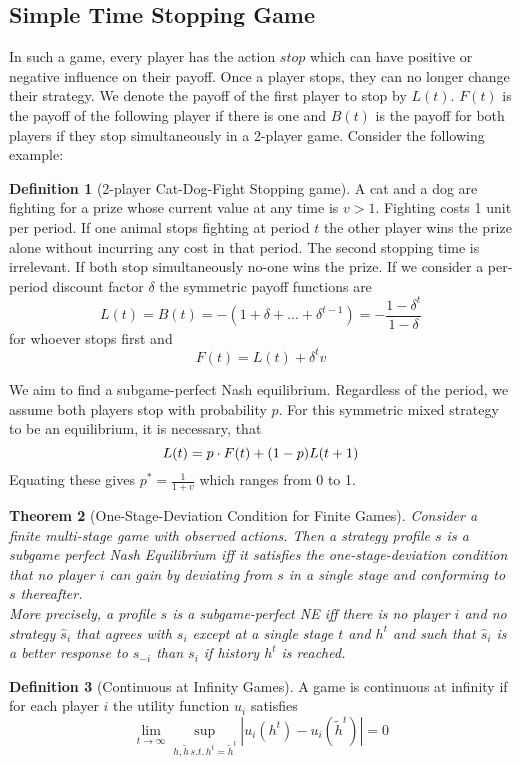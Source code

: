 \documentclass[a4paper, 12pt]{article}
\theoremstyle{plain}
\newtheorem{theorem}{Theorem}[subsection] %
\theoremstyle{definition}
\newtheorem{definition}[theorem]{Definition} %
\theoremstyle{lemma}
\theoremstyle{remark}
\theoremstyle{corollary}
\theoremstyle{example}
\begin{document}
	\subsection{Simple Time Stopping Game}
	In such a game, every player has the action $stop$ which can have positive or negative influence on their payoff. Once a player stops, they can no longer change their strategy. We denote the payoff of the first player to stop by $L(t)$. $F(t)$ is the payoff of the following player if there is one and $B(t)$ is the payoff for both players if they stop simultaneously in a 2-player game. Consider the following example:
	\begin{definition}[2-player Cat-Dog-Fight Stopping game]
		A cat and a dog are fighting for a prize whose current value at any time is $v>1$. Fighting costs 1 unit per period. If one animal stops fighting at period $t$ the other player wins the prize alone without incurring any cost in that period. The second stopping time is irrelevant. If both stop simultaneously no-one wins the prize. If we consider a per-period discount factor $\delta$ the symmetric payoff functions are \[L(t) = B(t) = -(1+\delta + ... + \delta^{t-1}) = -\frac{1-\delta^t}{1-\delta}\] for whoever stops first and \[F(t) = L(t)+\delta^tv\]
	\end{definition}
	We aim to find a subgame-perfect Nash equilibrium. Regardless of the period, we assume both players stop with probability $p$. For this symmetric mixed strategy to be an equilibrium, it is necessary, that \[L(t) = p\cdot F(t) + (1-p)L(t+1\\)\] Equating these gives $p^* = \frac{1}{1+v}$ which ranges from 0 to 1.
	\begin{theorem}[One-Stage-Deviation Condition for Finite Games]
		Consider a finite multi-stage game with observed actions. Then a strategy profile $s$ is a subgame perfect Nash Equilibrium iff it satisfies the one-stage-deviation condition that no player $i$ can gain by deviating from $s$ in a single stage and conforming to $s$ thereafter.\\
		More precisely, a profile $s$ is a subgame-perfect NE iff there is no player $i$ and no strategy $\hat{s}_i$ that agrees with $s_i$ except at a single stage $t$ and $h^t$ and such that $\hat{s}_i$ is a better response to $s_{-i}$ than $s_i$ if history $h^t$ is reached.
	\end{theorem}
	\begin{definition}[Continuous at Infinity Games]
		A game is continuous at infinity if for each player $i$ the utility function $u_i$ satisfies \[\lim_{t \to \infty} \sup_{h,\tilde{h} \,s.t.\, h^t = \tilde{h}^t} \left|u_i(h^t) - u_i(\tilde{h}^t)\right| = 0\]
	\end{definition}
\end{document}
